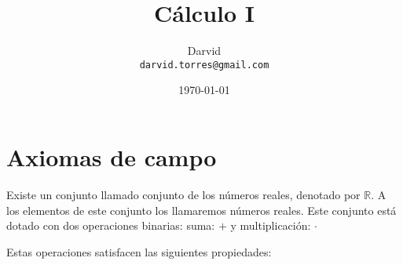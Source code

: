 \documentclass[11pt]{article}
\newcommand{\R}{\mathbb{R}}
\begin{document}
\title{\vspace{-2cm}Cálculo I}
\author{Darvid \\ \texttt{darvid.torres@gmail.com}}
\date{\today}
\maketitle
\thispagestyle{empty}

\section*{Axiomas de campo}

Existe un conjunto llamado conjunto de los números reales, denotado por $\R$. A los elementos de este conjunto los llamaremos números reales. Este conjunto está dotado con dos operaciones binarias: suma: $+$ y multiplicación: $\cdot$ 

Estas operaciones satisfacen las siguientes propiedades:
%
%
%
\end{document}
